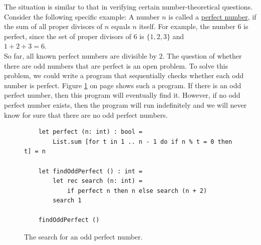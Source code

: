 The situation is similar to that in verifying certain number-theoretical
questions. Consider the following specific example: A number $n$ is called 
a \href{https://en.wikipedia.org/wiki/Perfect_number}{perfect number},
if the sum of all proper divisors of $n$ equals $n$ itself. For example, the number $6$ is perfect, since the set of proper divisors of $6$ is $\{1,2,3\}$ and 
\\[0.2cm]
\hspace*{1.3cm}
$1 + 2 + 3 = 6$.
\\[0.2cm]
So far, all known perfect numbers are divisible by $2$. The question of whether there are
odd numbers that are perfect is an open  problem. To solve this
problem, we could write a program that sequentially checks whether each
odd number is perfect. Figure \ref{fig:Find-Perfect.ipynb}
on page \pageref{fig:Find-Perfect.ipynb} shows such a program. If there is an odd perfect number,
then this program will eventually find it. However, if no
odd perfect number exists, then the program will run indefinitely and
we will never know for sure that there are no odd perfect numbers.

\begin{figure}[!ht]
  \centering
\begin{verbatim}
    let perfect (n: int) : bool =
        List.sum [for t in 1 .. n - 1 do if n % t = 0 then t] = n

    let findOddPerfect () : int =
        let rec search (n: int) =
            if perfect n then n else search (n + 2)
        search 1

    findOddPerfect ()
\end{verbatim}
\vspace*{-0.3cm}
  \caption{The search for an odd perfect number.}
  \label{fig:Find-Perfect.ipynb}
\end{figure} 

